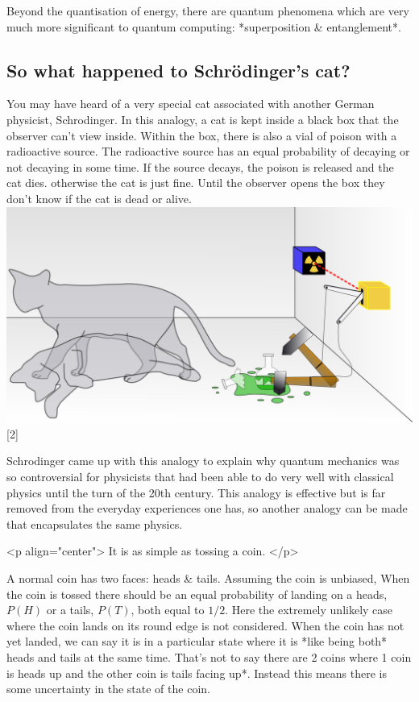 \documentclass{book}
\begin{document}
Beyond the quantisation of energy, there are quantum phenomena which are very much more significant to quantum computing: *superposition \& entanglement*. 

\subsection{ So what happened to Schrödinger’s cat?}

You may have heard of a very special cat associated with another German physicist, Schrodinger. In this analogy, a cat is kept inside a black box that the observer can't view inside. Within the box, there is also a vial of poison with a radioactive source. The radioactive source has an equal probability of decaying or not decaying in some time. If the source decays, the poison is released and the cat dies. otherwise the cat is just fine. Until the observer opens the box they don't know if the cat is dead or alive. 
\includegraphics{images/standard_cat.png}
[2]

Schrodinger came up with this analogy to explain why quantum mechanics was so controversial for physicists that had been able to do very well with classical physics until the turn of the 20th century. This analogy is effective but is far removed from the everyday experiences one has, so another analogy can be made that encapsulates the same physics. 


<p align="center">
    It is as simple as tossing a coin.
</p>


A normal coin has two faces: heads & tails. Assuming the coin is unbiased, When the coin is tossed there should be an equal probability of landing on a heads, $P(H)$ or a tails, $P(T)$, both equal to $1/2$. Here the extremely unlikely case where the coin lands on its round edge is not considered. When the coin has not yet landed, we can say it is in a particular state where it is *like being both* heads and tails at the same time. That's not to say there are 2 coins where 1 coin is heads up and the other coin is tails facing up*. Instead this means there is some uncertainty in the state of the coin. 
\end{document}

